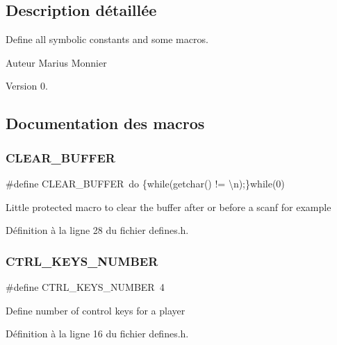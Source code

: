 \subsection{Description détaillée}
Define all symbolic constants and some macros. 

\begin{DoxyAuthor}{Auteur}
Marius Monnier 
\end{DoxyAuthor}
\begin{DoxyVersion}{Version}
0. 
\end{DoxyVersion}


\subsection{Documentation des macros}
\mbox{\label{defines_8h_aa28dd17f6f34a0944a90f741b0251239}} 
\subsubsection{C\+L\+E\+A\+R\+\_\+\+B\+U\+F\+F\+ER}
{\footnotesize\ttfamily \#define C\+L\+E\+A\+R\+\_\+\+B\+U\+F\+F\+ER~do \{while(getchar() != \textquotesingle{}\textbackslash{}n\textquotesingle{});\}while(0)}

Little protected macro to clear the buffer after or before a scanf for example 

Définition à la ligne 28 du fichier defines.\+h.

\mbox{\label{defines_8h_aad5c97fa552c0b5e940254a27cb04c94}} 
\subsubsection{C\+T\+R\+L\+\_\+\+K\+E\+Y\+S\+\_\+\+N\+U\+M\+B\+ER}
{\footnotesize\ttfamily \#define C\+T\+R\+L\+\_\+\+K\+E\+Y\+S\+\_\+\+N\+U\+M\+B\+ER~4}

Define number of control keys for a player 

Définition à la ligne 16 du fichier defines.\+h.

\mbox{\label{defines_8h_a97d832ae23af4f215e801e37e4f94254}} 
